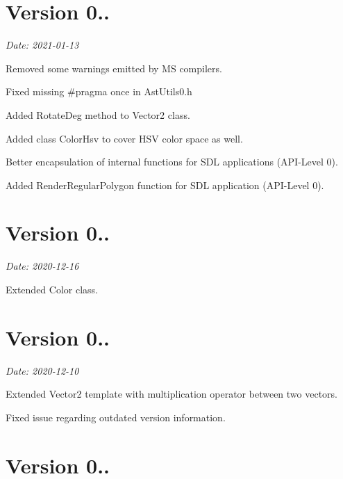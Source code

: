 \section*{Version 0..}

{\itshape Date\+: 2021-\/01-\/13}


\begin{DoxyItemize}
\item Removed some warnings emitted by MS compilers.
\item Fixed missing {\ttfamily \#pragma once} in Ast\+Utils0.\+h
\item Added {\ttfamily Rotate\+Deg} method to {\ttfamily Vector2} class.
\item Added class \textquotesingle{} {\ttfamily Color\+Hsv} to cover H\+SV color space as well.
\item Better encapsulation of internal functions for S\+DL applications (A\+P\+I-\/\+Level 0).
\item Added {\ttfamily Render\+Regular\+Polygon} function for S\+DL application (A\+P\+I-\/\+Level 0).
\end{DoxyItemize}

\section*{Version 0..}

{\itshape Date\+: 2020-\/12-\/16}
\begin{DoxyItemize}
\item Extended {\ttfamily Color} class.
\end{DoxyItemize}

\section*{Version 0..}

{\itshape Date\+: 2020-\/12-\/10}


\begin{DoxyItemize}
\item Extended {\ttfamily Vector2} template with multiplication operator between two vectors.
\item Fixed issue regarding outdated version information.
\end{DoxyItemize}

\section*{Version 0..}

